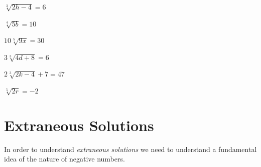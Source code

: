 \documentclass[12pt]{article}
\begin{document}
\begin{enumerate}
	\begin{multicols}{2}
	\end{multicols}
\end{enumerate}





\pagebreak

\section{Extraneous Solutions}
In order to understand \textit{extraneous solutions} we need to understand a fundamental idea of the nature of negative numbers.\\
\end{document}
